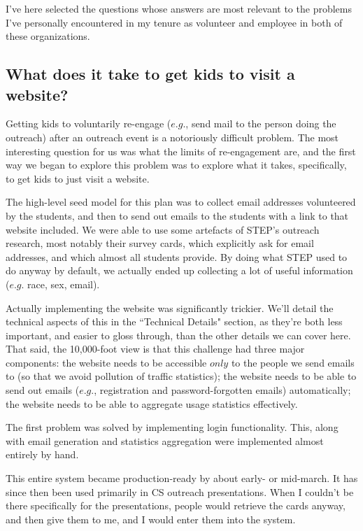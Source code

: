 \documentclass[11pt,a4paper]{article}
\begin{document}
I've here selected the questions whose answers are most relevant to the problems I've personally encountered in my tenure as volunteer and employee in both of these organizations.

\subsection{What does it take to get kids to visit a website?}

Getting kids to voluntarily re-engage ($\textit{e.g.}$, send mail to the person doing the outreach) after an outreach event is a notoriously difficult problem. The most interesting question for us was what the limits of re-engagement are, and the first way we began to explore this problem was to explore what it takes, specifically, to get kids to just visit a website.

The high-level seed model for this plan was to collect email addresses volunteered by the students, and then to send out emails to the students with a link to that website included.  We were able to use some artefacts of STEP's outreach research, most notably their survey cards, which explicitly ask for email addresses, and which almost all students provide. By doing what STEP used to do anyway by default, we actually ended up collecting a lot of useful information ($\textit{e.g.}$ race, sex, email).

Actually implementing the website was significantly trickier. We'll detail the technical aspects of this in the ``Technical Details" section, as they're both less important, and easier to gloss through, than the other details we can cover here. That said, the 10,000-foot view is that this challenge had three major components: the website needs to be accessible $\textit{only}$ to the people we send emails to (so that we avoid pollution of traffic statistics); the website needs to be able to send out emails ($\textit{e.g.}$, registration and password-forgotten emails) automatically; the website needs to be able to aggregate usage statistics effectively.

The first problem was solved by implementing login functionality. This, along with email generation and statistics aggregation were implemented almost entirely by hand.

This entire system became production-ready by about early- or mid-march. It has since then been used primarily in CS outreach presentations. When I couldn't be there specifically for the presentations, people would retrieve the cards anyway, and then give them to me, and I would enter them into the system.
\end{document}
